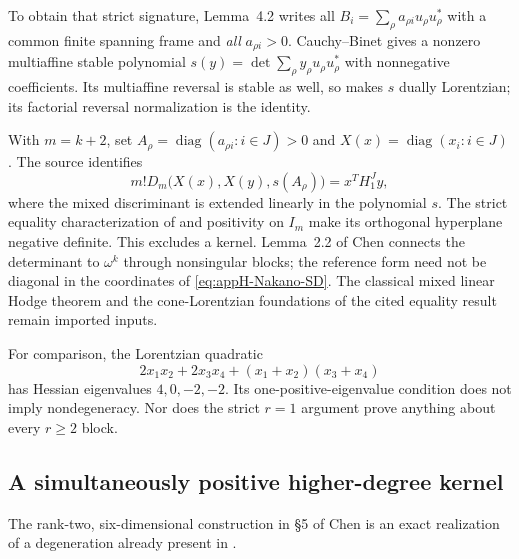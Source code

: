 To obtain that strict signature, Lemma~4.2 writes all
$B_i=\sum_\rho a_{\rho i}u_\rho u_\rho^*$ with a common
finite spanning frame and \emph{all} $a_{\rho i}>0$.
Cauchy--Binet gives a nonzero multiaffine stable polynomial
$s(y)=\det\sum_\rho y_\rho u_\rho u_\rho^*$ with
nonnegative coefficients. Its multiaffine reversal is stable
as well, so \cite[Proposition~2.2]{BrandenHuh20Lorentzian}
makes $s$ dually Lorentzian; its factorial reversal
normalization is the identity.

With $m=k+2$, set
$A_\rho=\operatorname{diag}(a_{\rho i}:i\in J)>0$
and $X(x)=\operatorname{diag}(x_i:i\in J)$.
The source identifies
\[
 m!D_m\bigl(X(x),X(y),s(A_\rho)\bigr)=x^TH_1^Jy,
\]
where the mixed discriminant is extended linearly in the
polynomial $s$. The strict equality characterization of
\cite[Theorem~8.2]{RossSuessWannerer25DuallyPublished}
and positivity on $I_m$ make its orthogonal hyperplane
negative definite. This excludes a kernel. Lemma~2.2 of Chen connects
the determinant to $\omega^k$ through nonsingular blocks;
the reference form need not be diagonal in the coordinates
of \eqref{eq:appH-Nakano-SD}. The classical mixed linear
Hodge theorem and the cone-Lorentzian foundations of the
cited equality result remain imported inputs.

For comparison, the Lorentzian quadratic
\[
 2x_1x_2+2x_3x_4+(x_1+x_2)(x_3+x_4)
\]
has Hessian eigenvalues $4,0,-2,-2$. Its one-positive-eigenvalue
condition does not imply nondegeneracy. Nor does the strict
$r=1$ argument prove anything about every $r\geq2$ block.

\subsection{A simultaneously positive higher-degree kernel}
\label{sec:appH-Nakano-SD-higher-kernel}

The rank-two, six-dimensional construction in \S5 of Chen
is an exact realization of a degeneration already present in
\cite[Example~9.2, physical p.~37]{RossToma21SchurHRV3}.

